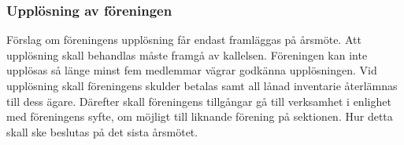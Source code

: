 \subsubsection{Upplösning av föreningen} \label{sec:upplösing}
Förslag om föreningens upplösning får endast framläggas på årsmöte. Att upplösning skall behandlas måste framgå av kallelsen. Föreningen kan inte upplösas så länge minst fem medlemmar vägrar godkänna upplösningen. Vid upplösning skall föreningens skulder betalas samt all lånad inventarie återlämnas till dess ägare. Därefter skall föreningens tillgångar gå till verksamhet i enlighet med föreningens syfte, om möjligt till liknande förening på sektionen. Hur detta skall ske beslutas på det sista årsmötet.


